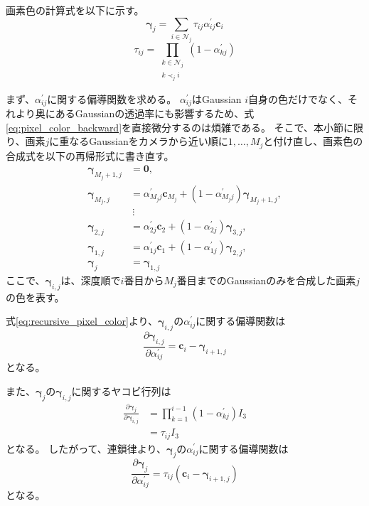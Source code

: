 \documentclass[dvipdfmx]{jlreq}
\begin{document}
画素色の計算式を以下に示す。
\begin{equation}
    \bm{\gamma}_j = \sum_{i\in\mathcal{N}_j}\tau_{ij}\alpha_{ij}^{\prime}\bm{c}_i
    \label{eq:pixel_color_backward}
\end{equation}
\begin{equation}
    \tau_{ij} = \prod_{\substack{k\in\mathcal{N}_j\\k\prec_j i}}\left(1-\alpha_{kj}^{\prime}\right)
    \label{eq:transmittance_backward}
\end{equation}

まず、$\alpha_{ij}^{\prime}$に関する偏導関数を求める。
$\alpha_{ij}^{\prime}$はGaussian $i$自身の色だけでなく、それより奥にあるGaussianの透過率にも影響するため、式\eqref{eq:pixel_color_backward}を直接微分するのは煩雑である。
そこで、本小節に限り、画素$j$に重なるGaussianをカメラから近い順に$1,\ldots,M_j$と付け直し、画素色の合成式を以下の再帰形式に書き直す。
\begin{equation}
    \begin{aligned}
        \bm{\gamma}_{M_j+1,j} &=\bm{0},\\
        \bm{\gamma}_{M_j,j} &= \alpha_{M_jj}^{\prime}\bm{c}_{M_j} + \left(1-\alpha_{M_jj}^{\prime}\right)\bm{\gamma}_{M_j+1,j},\\
        &\ \vdots\\
        \bm{\gamma}_{2,j} &= \alpha_{2j}^{\prime}\bm{c}_2 + \left(1-\alpha_{2j}^{\prime}\right) \bm{\gamma}_{3,j},\\
        \bm{\gamma}_{1,j} &= \alpha_{1j}^{\prime}\bm{c}_1 + \left(1-\alpha_{1j}^{\prime}\right) \bm{\gamma}_{2,j},\\
        \bm{\gamma}_j &=\bm{\gamma}_{1,j}
    \end{aligned}
    \label{eq:recursive_pixel_color}
\end{equation}
ここで、$\bm{\gamma}_{i,j}$は、深度順で$i$番目から$M_j$番目までのGaussianのみを合成した画素$j$の色を表す。

式\eqref{eq:recursive_pixel_color}より、$\bm{\gamma}_{i,j}$の$\alpha_{ij}^{\prime}$に関する偏導関数は
\begin{equation}
    \frac{\partial\bm{\gamma}_{i,j}}{\partial\alpha_{ij}^{\prime}} = \bm{c}_i-\bm{\gamma}_{i+1,j}
    \label{eq:recursive_color_opacity_jacobian}
\end{equation}
となる。

また、$\bm{\gamma}_j$の$\bm{\gamma}_{i,j}$に関するヤコビ行列は
\begin{equation}
    \begin{aligned}
        \frac{\partial\bm{\gamma}_j}{\partial\bm{\gamma}_{i,j}} &= \prod_{k=1}^{i-1}\left(1-\alpha_{kj}^{\prime}\right)I_3\\
        &= \tau_{ij}I_3
    \end{aligned}
    \label{eq:pixel_color_recursive_jacobian}
\end{equation}
となる。
したがって、連鎖律より、$\bm{\gamma}_j$の$\alpha_{ij}^{\prime}$に関する偏導関数は
\begin{equation}
    \frac{\partial\bm{\gamma}_j}{\partial\alpha_{ij}^{\prime}} = \tau_{ij}\left(\bm{c}_i-\bm{\gamma}_{i+1,j}\right)
    \label{eq:pixel_color_screen_opacity_jacobian}
\end{equation}
となる。
\end{document}
